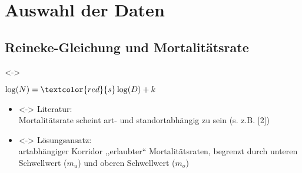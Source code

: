 \section{Auswahl der Daten}
\subsection{Reineke-Gleichung und Mortalitätsrate}
\begin{frame}[c]
  \visible<\theFirstElement->{
    \begin{center}
      \begin{minipage}{0.40\textwidth}
        \centerline{\(\mylog(N) = \textcolor{red}{s} \log(D) + k\)}
        \vspace{\captiondistance}
      \end{minipage}
    \end{center}

  }

  \begin{itemize}
  \item<\theSecondElement-> Literatur: \\
    Mortalitätsrate scheint art- und standortabhängig zu sein (s. z.B. [2])
  \item<\theSecondElement-> Lösungsansatz: \\
    artabhängiger Korridor ,,erlaubter`` Mortalitätsraten, begrenzt durch unteren Schwellwert (\(m_u\)) und oberen Schwellwert (\(m_o\))
  \end{itemize}
\end{frame}

